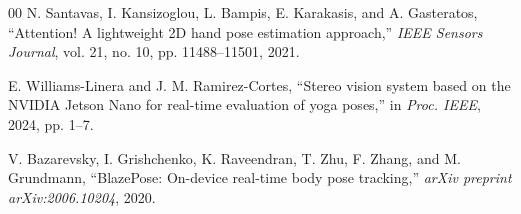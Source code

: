 \documentclass[10pt,letterpaper]{article}
\begin{document}
\begin{thebibliography}{00}
N. Santavas, I. Kansizoglou, L. Bampis, E. Karakasis, and A. Gasteratos, ``Attention! A lightweight 2D hand pose estimation approach,'' \emph{IEEE Sensors Journal}, vol. 21, no. 10, pp. 11488--11501, 2021.

E. Williams-Linera and J. M. Ramirez-Cortes, ``Stereo vision system based on the NVIDIA Jetson Nano for real-time evaluation of yoga poses,'' in \emph{Proc. IEEE}, 2024, pp. 1--7.

V. Bazarevsky, I. Grishchenko, K. Raveendran, T. Zhu, F. Zhang, and M. Grundmann, ``BlazePose: On-device real-time body pose tracking,'' \emph{arXiv preprint arXiv:2006.10204}, 2020.

\end{thebibliography}
\end{document}
